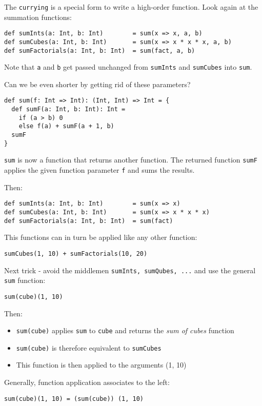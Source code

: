 \documentclass{scrartcl}
\newcommand{\term}[1]{\verb~#1~} %
\begin{document}
The \term{currying} is a special form to write a high-order function. Look again
at the summation functions:
\begin{lstlisting}
def sumInts(a: Int, b: Int)        = sum(x => x, a, b)
def sumCubes(a: Int, b: Int)       = sum(x => x * x * x, a, b)
def sumFactorials(a: Int, b: Int)  = sum(fact, a, b)
\end{lstlisting}
Note that \lstinline|a| and \lstinline|b| get passed unchanged from
\lstinline|sumInts| and \lstinline|sumCubes| into \lstinline|sum|.

Can we be even shorter by getting rid of these parameters?
\begin{lstlisting}
def sum(f: Int => Int): (Int, Int) => Int = {
  def sumF(a: Int, b: Int): Int =
    if (a > b) 0
    else f(a) + sumF(a + 1, b)
  sumF
}
\end{lstlisting}
\lstinline|sum| is now a function that returns another function. The returned
function \lstinline|sumF| applies the given function parameter \lstinline|f| and
sums the results.

Then:
\begin{lstlisting}
def sumInts(a: Int, b: Int)        = sum(x => x)
def sumCubes(a: Int, b: Int)       = sum(x => x * x * x)
def sumFactorials(a: Int, b: Int)  = sum(fact)
\end{lstlisting}

This functions can in turn be applied like any other function:
\begin{lstlisting}
sumCubes(1, 10) + sumFactorials(10, 20)
\end{lstlisting}

Next trick - avoid the middlemen \lstinline|sumInts, sumQubes, ...| and use the
general \lstinline|sum| function:

\begin{lstlisting}
sum(cube)(1, 10)
\end{lstlisting}
Then:
\begin{itemize}
\item \lstinline|sum(cube)| applies \lstinline|sum| to \lstinline|cube| and
  returns the {\it sum of cubes} function
\item \lstinline|sum(cube)| is therefore equivalent to \lstinline|sumCubes|
\item This function is then applied to the arguments (1, 10)
\end{itemize}

Generally, function application associates to the left:
\begin{lstlisting}
sum(cube)(1, 10) = (sum(cube)) (1, 10)
\end{lstlisting}
\end{document}
